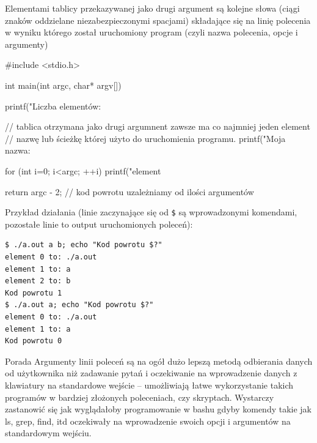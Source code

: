 Elementami tablicy przekazywanej jako drugi argument są kolejne słowa
(ciągi znaków oddzielane niezabezpieczonymi spacjami) składające się na linię polecenia
w wyniku którego został uruchomiony program (czyli nazwa polecenia, opcje i argumenty)


\begin{CodeFrame*}[c]{}
#include <stdio.h>

int main(int argc, char* argv[]) {
	printf("Liczba elementów: %
	
	// tablica otrzymana jako drugi argumnent zawsze ma co najmniej jeden element
	// nazwę lub ścieżkę której użyto do uruchomienia programu.
	printf("Moja nazwa: %
	
	for (int i=0; i<argc; ++i)
		printf("element %
	
	return argc - 2; // kod powrotu uzależniamy od ilości argumentów
}
\end{CodeFrame*}

Przykład działania (linie zaczynające się od \Verb#$# są wprowadzonymi komendami, pozostałe linie to output uruchomionych poleceń):
\begin{Verbatim}
$ ./a.out a b; echo "Kod powrotu $?"
element 0 to: ./a.out
element 1 to: a
element 2 to: b
Kod powrotu 1
$ ./a.out a; echo "Kod powrotu $?"
element 0 to: ./a.out
element 1 to: a
Kod powrotu 0
\end{Verbatim}

\begin{ProTip}{Porada}
Argumenty linii poleceń są na ogół dużo lepszą metodą odbierania danych od użytkownika niż zadawanie pytań i oczekiwanie na wprowadzenie danych z klawiatury na standardowe wejście – umożliwiają łatwe wykorzystanie takich programów w bardziej złożonych poleceniach, czy skryptach. Wystarczy zastanowić się jak wyglądałoby programowanie w bashu gdyby komendy takie jak ls, grep, find, itd oczekiwały na wprowadzenie swoich opcji i argumentów na standardowym wejściu.
\end{ProTip}
